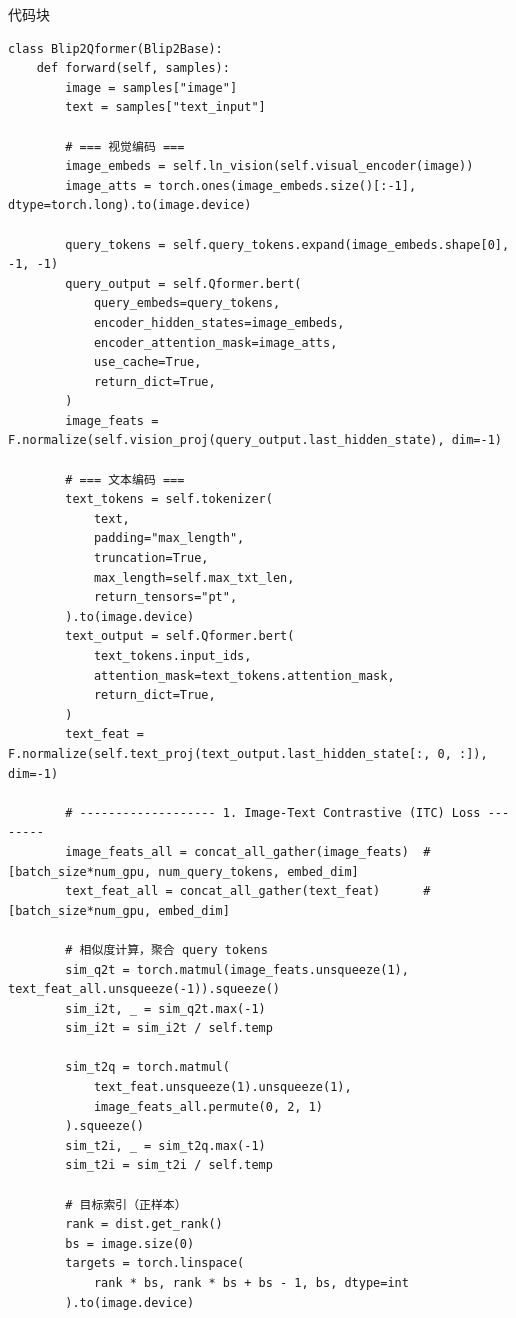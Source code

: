 \documentclass[zihao=false,fontset=windows]{ctexart}
\newcommand{\codehead}{{\small\ttfamily\color{feishuGray}代码块}\par\vspace{-0.15em}}
\begin{document}
\begin{feishucode}
\codehead
\begin{lstlisting}
class Blip2Qformer(Blip2Base):
    def forward(self, samples):
        image = samples["image"]
        text = samples["text_input"]

        # === 视觉编码 ===
        image_embeds = self.ln_vision(self.visual_encoder(image))
        image_atts = torch.ones(image_embeds.size()[:-1], dtype=torch.long).to(image.device)

        query_tokens = self.query_tokens.expand(image_embeds.shape[0], -1, -1)
        query_output = self.Qformer.bert(
            query_embeds=query_tokens,
            encoder_hidden_states=image_embeds,
            encoder_attention_mask=image_atts,
            use_cache=True,
            return_dict=True,
        )
        image_feats = F.normalize(self.vision_proj(query_output.last_hidden_state), dim=-1)

        # === 文本编码 ===
        text_tokens = self.tokenizer(
            text,
            padding="max_length",
            truncation=True,
            max_length=self.max_txt_len,
            return_tensors="pt",
        ).to(image.device)
        text_output = self.Qformer.bert(
            text_tokens.input_ids,
            attention_mask=text_tokens.attention_mask,
            return_dict=True,
        )
        text_feat = F.normalize(self.text_proj(text_output.last_hidden_state[:, 0, :]), dim=-1)

        # ------------------- 1. Image-Text Contrastive (ITC) Loss --------
        image_feats_all = concat_all_gather(image_feats)  # [batch_size*num_gpu, num_query_tokens, embed_dim]
        text_feat_all = concat_all_gather(text_feat)      # [batch_size*num_gpu, embed_dim]
        
        # 相似度计算，聚合 query tokens
        sim_q2t = torch.matmul(image_feats.unsqueeze(1), text_feat_all.unsqueeze(-1)).squeeze()
        sim_i2t, _ = sim_q2t.max(-1)
        sim_i2t = sim_i2t / self.temp

        sim_t2q = torch.matmul(
            text_feat.unsqueeze(1).unsqueeze(1),
            image_feats_all.permute(0, 2, 1)
        ).squeeze()
        sim_t2i, _ = sim_t2q.max(-1)
        sim_t2i = sim_t2i / self.temp

        # 目标索引（正样本）
        rank = dist.get_rank()
        bs = image.size(0)
        targets = torch.linspace(
            rank * bs, rank * bs + bs - 1, bs, dtype=int
        ).to(image.device)


\end{lstlisting}
\end{feishucode}
\end{document}
